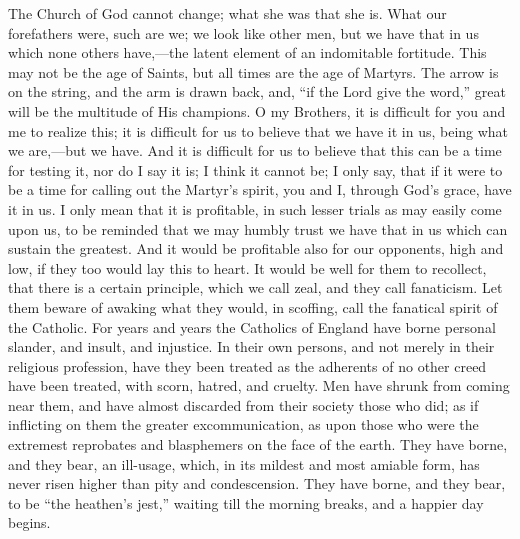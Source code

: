 The Church of God cannot change; what she was that she
is. What our forefathers were, such are we; we look like
other men, but we have that in us which none others
have,—the latent element of an indomitable
fortitude. This may not be the age of Saints, but all
times are the age of Martyrs. The arrow is on the string,
and the arm is drawn back, and, ``if the Lord give
the word,'' great will be the multitude of His
champions. O my Brothers, it is difficult for you and me
to realize this; it is difficult for us to believe that
we have it in us, being what we are,—but we have.
And it is difficult for us to believe that this can be a
time for testing it, nor do I say it is; I think it
cannot be; I only say, that if it were to be a time for
calling out the Martyr's spirit, you and I, through God's
grace, have it in us. I only mean that it is profitable,
in such lesser trials as may easily come upon us, to be
reminded that we may humbly trust we have that in us
which can sustain the greatest. And it would be
profitable also for our opponents, high and low, if they
too would lay this to heart. It would be well for them to
recollect, that there is a certain principle, which we
call zeal, and they call fanaticism. Let them beware of
awaking what they would, in scoffing, call the fanatical
spirit of the Catholic. For years and years the Catholics
of England have borne personal slander, and insult, and
injustice. In their own persons, and not merely in their
religious profession, have they been treated as the
adherents of no other creed have been treated, with
scorn, hatred, and cruelty. Men have shrunk from coming
near them, and have almost discarded from their society
those who did; as if inflicting on them the greater
excommunication, as upon those who were the extremest
reprobates and blasphemers on the face of the earth. They
have borne, and they bear, an ill-usage, which, in its
mildest and most amiable form, has never risen higher
than pity and condescension. They have borne, and they
bear, to be ``the heathen's jest,'' waiting till
the morning breaks, and a happier day begins.

